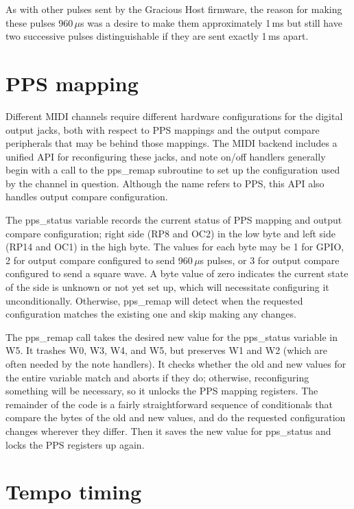 As with other pulses sent by the Gracious Host firmware, the reason for
making these pulses 960\,$\mu$s was a desire to make them approximately 1\,ms
but still have two successive pulses distinguishable if they are sent
exactly 1\,ms apart.

\section{PPS mapping}

Different MIDI channels require different hardware configurations for the
digital output jacks, both with respect to PPS mappings and the output
compare peripherals that may be behind those mappings.  The MIDI backend
includes a unified API for reconfiguring these jacks, and note on/off
handlers generally begin with a call to the pps\_remap subroutine to set up
the configuration used by the channel in question.  Although the name refers
to PPS, this API also handles output compare configuration.

The pps\_status variable records the current status of PPS mapping and
output compare configuration; right side (RP8 and OC2) in the low byte and
left side (RP14 and OC1) in the high byte.  The values for each byte may be
1 for GPIO, 2 for output compare configured to send 960\,$\mu$s pulses, or 3
for output compare configured to send a square wave.  A byte value of zero
indicates the current state of the side is unknown or not yet set up, which
will necessitate configuring it unconditionally.  Otherwise, pps\_remap
will detect when the requested configuration matches the existing one
and skip making any changes.

The pps\_remap call takes the desired new value for the pps\_status variable
in W5.  It trashes W0, W3, W4, and W5, but preserves W1 and W2 (which are
often needed by the note handlers).  It checks whether the old and new
values for the entire variable match and aborts if they do; otherwise,
reconfiguring something will be necessary, so it unlocks the PPS mapping
registers.  The remainder of the code is a fairly straightforward sequence
of conditionals that compare the bytes of the old and new values, and do the
requested configuration changes wherever they differ.  Then it saves the new
value for pps\_status and locks the PPS registers up again.

\section{Tempo timing}

